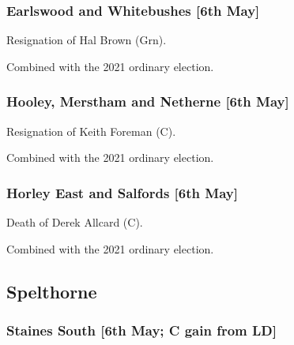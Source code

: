 \documentclass[a4paper,openany]{book}
\begin{document}
\begin{resultsiii}
\subsubsection*{Earlswood and Whitebushes \hspace*{\fill}\nolinebreak[1]%
	\enspace\hspace*{\fill}
	[6th May]}


Resignation of Hal Brown (Grn).

Combined with the 2021 ordinary election.

\subsubsection*{Hooley, Merstham and Netherne \hspace*{\fill}\nolinebreak[1]%
	\enspace\hspace*{\fill}
	[6th May]}


Resignation of Keith Foreman (C).

Combined with the 2021 ordinary election.

\subsubsection*{Horley East and Salfords \hspace*{\fill}\nolinebreak[1]%
	\enspace\hspace*{\fill}
	[6th May]}


Death of Derek Allcard (C).

Combined with the 2021 ordinary election.

\subsection*{Spelthorne}

\subsubsection*{Staines South \hspace*{\fill}\nolinebreak[1]%
	\enspace\hspace*{\fill}
	[6th May; C gain from LD]}


\end{resultsiii}
\end{document}
